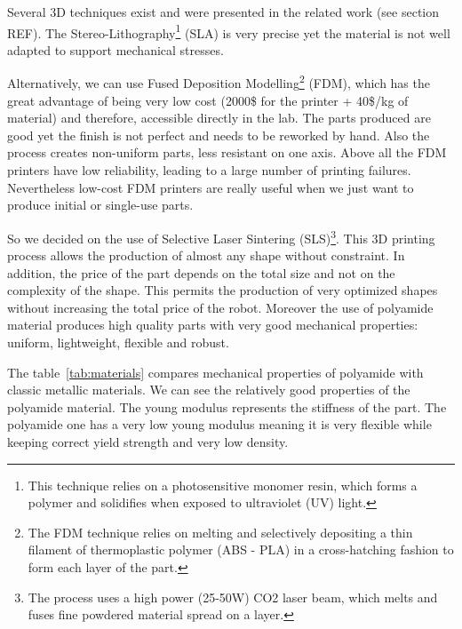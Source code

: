 Several 3D techniques exist and were presented in the related work (see section REF). The Stereo-Lithography\footnote{This technique relies on a photosensitive monomer resin, which forms a polymer and solidifies when exposed to ultraviolet (UV) light.} (SLA) is very precise yet the material is not well adapted to support mechanical stresses.

Alternatively, we can use Fused Deposition Modelling\footnote{The FDM technique relies on melting and selectively depositing a thin filament of thermoplastic polymer (ABS - PLA) in a cross-hatching fashion to form each layer of the part.} (FDM), which has the great advantage of being very low cost (2000\$ for the printer + 40\$/kg of material) and therefore, accessible directly in the lab. The parts produced are good yet the finish is not perfect and needs to be reworked by hand. Also the process creates non-uniform parts, less resistant on one axis. Above all the FDM printers have low reliability, leading to a large number of printing failures. Nevertheless low-cost FDM printers are really useful when we just want to produce initial or single-use parts.

So we decided on the use of Selective Laser Sintering (SLS)\footnote{The process uses a high power (25-50W) CO2 laser beam, which melts and fuses fine powdered material spread on a layer.}. This 3D printing process allows the production of almost any shape without constraint. In addition, the price of the part depends on the total size and not on the complexity of the shape. This permits the production of very optimized shapes without increasing the total price of the robot. Moreover the use of polyamide material produces high quality parts with very good mechanical properties: uniform, lightweight, flexible and robust.

The table~\ref{tab:materials} compares mechanical properties of polyamide with classic metallic materials. We can see the relatively good properties of the polyamide material. The young modulus represents the stiffness of the part. The polyamide one has a very low young modulus meaning it is very flexible while keeping correct yield strength and very low density.

